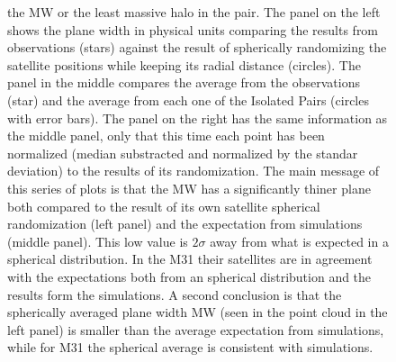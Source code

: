 \documentclass[a4paper,fleqn,usenatbib]{mnras}
\begin{document}
\begin{figure}
{  the MW or the least massive halo in the pair.
The panel on the left shows the plane width in physical units
comparing the results from observations
(stars) against the result of spherically randomizing the satellite
positions while keeping its radial distance (circles). 
The panel in the middle compares the average from the observations
(star) and the average from each one of the Isolated Pairs (circles
with error bars).
The panel on the right has the same information as the middle panel,
only that this time each point has been normalized (median substracted
and normalized by the standar deviation) to the results of its
randomization. 
The main message of this series of plots is that the MW has a
significantly thiner plane both compared to the result of its own
satellite spherical randomization (left panel) and the expectation from
simulations (middle panel). 
This low value is $2\sigma$ away from what is expected in a spherical
distribution. 
In the M31 their satellites are in agreement with the expectations
both from an spherical distribution and the results form the
simulations. 
A second conclusion is that the spherically averaged plane width
MW (seen in the point cloud in the left panel) is smaller than the
average expectation from simulations, while for M31 the spherical
average is consistent with simulations. 
\label{fig:scatter_width}}
\end{figure}
\end{document}
